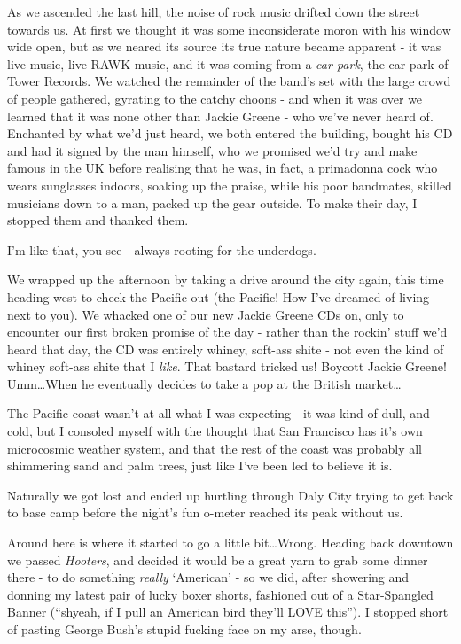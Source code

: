 \documentclass[a5paper,titlepage,draft]{book}
\begin{document}
As we ascended the last hill, the noise of rock music drifted down the street towards us.  At first we thought it was some inconsiderate moron with his window wide open, but as we neared its source its true nature became apparent - it was live music, live RAWK music, and it was coming from a \emph{car park}, the car park of Tower Records.  We watched the remainder of the band's set with the large crowd of people gathered, gyrating to the catchy choons - and when it was over we learned that it was none other than Jackie Greene - who we've never heard of.  Enchanted by what we'd just heard, we both entered the building, bought his CD and had it signed by the man himself, who we promised we'd try and make famous in the UK before realising that he was, in fact, a primadonna cock who wears sunglasses indoors, soaking up the praise, while his poor bandmates, skilled musicians down to a man, packed up the gear outside.  To make their day, I stopped them and thanked them.

I'm like that, you see - always rooting for the underdogs.

We wrapped up the afternoon by taking a drive around the city again, this time heading west to check the Pacific out (the Pacific! How I've dreamed of living next to you).  We whacked one of our new Jackie Greene CDs on, only to encounter our first broken promise of the day - rather than the rockin' stuff we'd heard that day, the CD was entirely whiney, soft-ass shite - not even the kind of whiney soft-ass shite that I \emph{like}.  That bastard tricked us!  Boycott Jackie Greene!  Umm\ldots When he eventually decides to take a pop at the British market\ldots

The Pacific coast wasn't at all what I was expecting - it was kind of dull, and cold, but I consoled myself with the thought that San Francisco has it's own microcosmic weather system, and that the rest of the coast was probably all shimmering sand and palm trees, just like I've been led to believe it is.

Naturally we got lost and ended up hurtling through Daly City trying to get back to base camp before the night's fun o-meter reached its peak without us.

Around here is where it started to go a little bit\ldots Wrong.  Heading back downtown we passed \emph{Hooters}, and decided it would be a great yarn to grab some dinner there - to do something \emph{really} `American' - so we did, after showering and donning my latest pair of lucky boxer shorts, fashioned out of a Star-Spangled Banner (``shyeah, if I pull an American bird they'll LOVE this'').  I stopped short of pasting George Bush's stupid fucking face on my arse, though.
\end{document}
